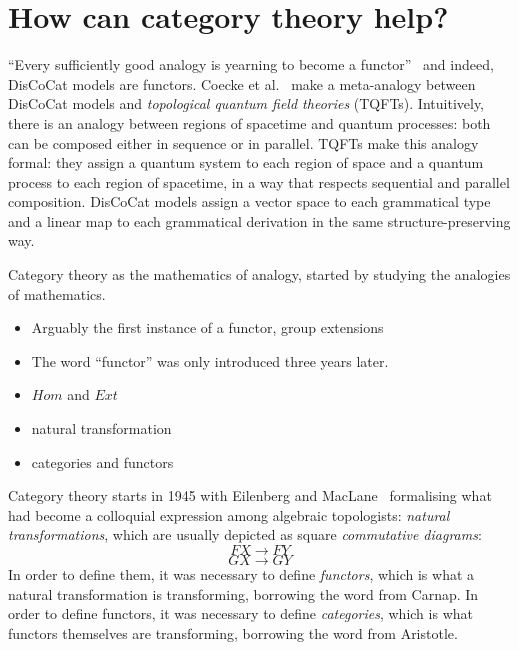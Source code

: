 
\section*{How can category theory help?}



``Every sufficiently good analogy is yearning to become a functor''~\cite{Baez06} and indeed, DisCoCat models are functors.
Coecke et al.~\cite{CoeckeEtAl13} make a meta-analogy between DisCoCat models and \emph{topological quantum field theories} (TQFTs).
Intuitively, there is an analogy between regions of spacetime and quantum processes: both can be composed either in sequence or in parallel.
TQFTs make this analogy formal: they assign a quantum system to each region of space and a quantum process to each region of spacetime, in a way that respects sequential and parallel composition.
DisCoCat models assign a vector space to each grammatical type and a linear map to each grammatical derivation in the same structure-preserving way.

Category theory as the mathematics of analogy, started by studying the analogies of mathematics.

\begin{itemize}
    \item Arguably the first instance of a functor, group extensions \cite{Baer34}
    \item The word ``functor'' \cite{Carnap37} was only introduced three years later.
    \item $Hom$ and $Ext$ \cite{EilenbergMacLane42a}
    \item natural transformation \cite{EilenbergMacLane42b}
    \item categories and functors \cite{EilenbergMacLane45}

\end{itemize}

Category theory starts in 1945 with Eilenberg and MacLane~\cite{EilenbergMacLane45} formalising what had become a colloquial expression among algebraic topologists: \emph{natural transformations}, which are usually depicted as square \emph{commutative diagrams}:
$$FX \to FY$$
$$GX \to GY$$
In order to define them, it was necessary to define \emph{functors}, which is what a natural transformation is transforming, borrowing the word from Carnap.
In order to define functors, it was necessary to define \emph{categories}, which is what functors themselves are transforming, borrowing the word from Aristotle.
